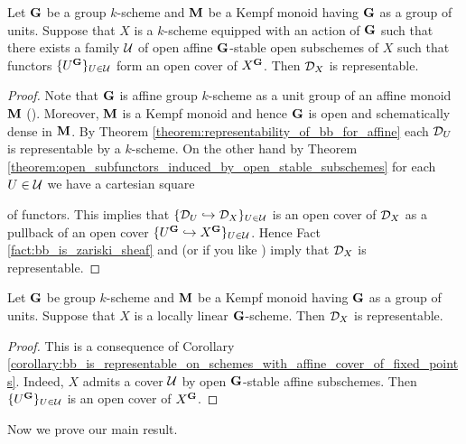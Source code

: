 \begin{corollary}\label{corollary:bb_is_representable_on_schemes_with_affine_cover_of_fixed_points}
Let $\mathbf{G}$ be a group $k$-scheme and $\mathbf{M}$ be a Kempf monoid having $\mathbf{G}$ as a group of units. Suppose that $X$ is a $k$-scheme equipped with an action of $\mathbf{G}$ such that there exists a family ${\mathcal U}$ of open affine $\mathbf{G}$-stable open subschemes of $X$ such that functors $\{U^{\mathbf{G}}\}_{U \in {\mathcal U}}$ form an open cover of $X^{\mathbf{G}}$. Then ${\mathcal D}_X$ is representable.
\end{corollary}
\begin{proof}
Note that $\mathbf{G}$ is affine group $k$-scheme as a unit group of an affine monoid $\mathbf{M}$ ({\cite[Proposition 12.4]{Monoid_k_functors}}). Moreover, $\mathbf{M}$ is a Kempf monoid and hence $\mathbf{G}$ is open and schematically dense in $\mathbf{M}$. By Theorem \ref{theorem:representability_of_bb_for_affine} each ${\mathcal D}_U$ is representable by a $k$-scheme. On the other hand by Theorem \ref{theorem:open_subfunctors_induced_by_open_stable_subschemes} for each $U\in {\mathcal U}$ we have a cartesian square
\begin{center}
\end{center}
of functors. This implies that $\{{\mathcal D}_U\hookrightarrow {\mathcal D}_X\}_{U\in {\mathcal U}}$ is an open cover of ${\mathcal D}_X$ as a pullback of an open cover $\{U^{\mathbf{G}}\hookrightarrow X^{\mathbf{G}}\}_{U\in {\mathcal U}}$. Hence Fact \ref{fact:bb_is_zariski_sheaf} and {\cite[Theorem 8.9]{gortz2010algebraic}} (or if you like {\cite[Theorem 4.6]{kfunctors}}) imply that ${\mathcal D}_X$ is representable. 
\end{proof}

\begin{corollary}\label{corollary:bb_is_representable_on_locally_linear_schemes}
Let $\mathbf{G}$ be group $k$-scheme and $\mathbf{M}$ be a Kempf monoid having $\mathbf{G}$ as a group of units. Suppose that $X$ is a locally linear $\mathbf{G}$-scheme. Then ${\mathcal D}_X$ is representable.
\end{corollary}
\begin{proof}
This is a consequence of Corollary \ref{corollary:bb_is_representable_on_schemes_with_affine_cover_of_fixed_points}. Indeed, $X$ admits a cover ${\mathcal U}$ by open $\mathbf{G}$-stable affine subschemes. Then $\{U^{\mathbf{G}}\}_{U\in {\mathcal U}}$ is an open cover of $X^{\mathbf{G}}$.
\end{proof}
\noindent
Now we prove our main result.

